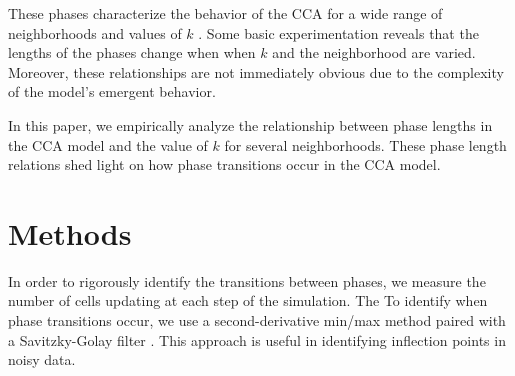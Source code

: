 \documentclass[%
 reprint,
 amsmath,amssymb,
 aps,
]{revtex4-1}
\begin{document}
These phases characterize the behavior of the CCA for a wide range of neighborhoods and values of $k$ \cite{Fisch1991Thresh}. Some basic experimentation reveals that the lengths of the phases change when when $k$ and the neighborhood are varied. Moreover, these relationships are not immediately obvious due to the complexity of the model's emergent behavior.

In this paper, we empirically analyze the relationship between phase lengths in the CCA model and the value of $k$ for several neighborhoods. These phase length relations shed light on how phase transitions occur in the CCA model. 

\section{Methods} 
In order to rigorously identify the transitions between phases, we measure the number of cells updating at each step of the simulation. The 
To identify when phase transitions occur, we use a second-derivative min/max method paired with a Savitzky-Golay filter \cite{SavitzkyGolay}. This approach is useful in identifying inflection points in noisy data.




\end{document}

